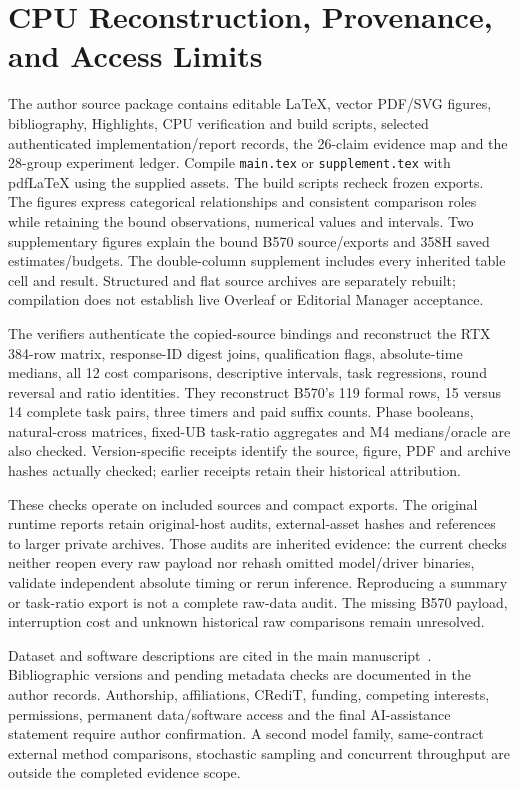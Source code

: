 \section{CPU Reconstruction, Provenance, and Access Limits}
\label{supp:reproducibility}
The author source package contains editable LaTeX, vector PDF/SVG figures, bibliography, Highlights, CPU verification and build scripts, selected authenticated implementation/report records, the 26-claim evidence map and the 28-group experiment ledger. Compile \texttt{main.tex} or \texttt{supplement.tex} with pdfLaTeX using the supplied assets. The build scripts recheck frozen exports. The figures express categorical relationships and consistent comparison roles while retaining the bound observations, numerical values and intervals. Two supplementary figures explain the bound B570 source/exports and 358H saved estimates/budgets. The double-column supplement includes every inherited table cell and result. Structured and flat source archives are separately rebuilt; compilation does not establish live Overleaf or Editorial Manager acceptance.

The verifiers authenticate the copied-source bindings and reconstruct the RTX 384-row matrix, response-ID digest joins, qualification flags, absolute-time medians, all 12 cost comparisons, descriptive intervals, task regressions, round reversal and ratio identities. They reconstruct B570's 119 formal rows, 15 versus 14 complete task pairs, three timers and paid suffix counts. Phase booleans, natural-cross matrices, fixed-UB task-ratio aggregates and M4 medians/oracle are also checked. Version-specific receipts identify the source, figure, PDF and archive hashes actually checked; earlier receipts retain their historical attribution.

These checks operate on included sources and compact exports. The original runtime reports retain original-host audits, external-asset hashes and references to larger private archives. Those audits are inherited evidence: the current checks neither reopen every raw payload nor rehash omitted model/driver binaries, validate independent absolute timing or rerun inference. Reproducing a summary or task-ratio export is not a complete raw-data audit. The missing B570 payload, interruption cost and unknown historical raw comparisons remain unresolved.

Dataset and software descriptions are cited in the main manuscript~\cite{humaneval,mbpp,specbench,llamacpp,qwen3}. Bibliographic versions and pending metadata checks are documented in the author records. Authorship, affiliations, CRediT, funding, competing interests, permissions, permanent data/software access and the final AI-assistance statement require author confirmation. A second model family, same-contract external method comparisons, stochastic sampling and concurrent throughput are outside the completed evidence scope.

